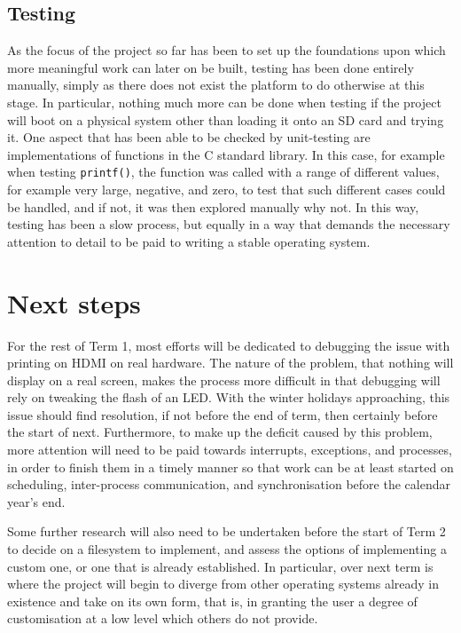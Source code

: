 \documentclass[10pt,a4paper]{article}
\newcommand{\code}[1]{\texttt{#1}}
\begin{document}
\subsection{Testing}
As the focus of the project so far has been to set up the foundations upon which
more meaningful work can later on be built, testing has been done entirely
manually, simply as there does not exist the platform to do otherwise at this
stage. In particular, nothing much more can be done when testing if the project
will boot on a physical system other than loading it onto an SD card and
trying it. One aspect that has been able to be checked by unit-testing are
implementations of functions in the C standard library. In this case, for
example when testing \code{printf()}, the function was called with a range of
different values, for example very large, negative, and zero, to test that such
different cases could be handled, and if not, it was then explored manually why
not. In this way, testing has been a slow process, but equally in a way that
demands the necessary attention to detail to be paid to writing a stable
operating system.

\section{Next steps}
For the rest of Term 1, most efforts will be dedicated to debugging the issue
with printing on HDMI on real hardware. The nature of the problem, that nothing
will display on a real screen, makes the process more difficult in that
debugging will rely on tweaking the flash of an LED. With the winter holidays
approaching, this issue should find resolution, if not before the end of term,
then certainly before the start of next. Furthermore, to make up the deficit
caused by this problem, more attention will need to be paid towards interrupts,
exceptions, and processes, in order to finish them in a timely manner so that
work can be at least started on scheduling, inter-process communication, and
synchronisation before the calendar year's end.

Some further research will also need to be undertaken before the start of Term 2
to decide on a filesystem to implement, and assess the options of implementing a
custom one, or one that is already established. In particular, over next term is
where the project will begin to diverge from other operating systems already in
existence and take on its own form, that is, in granting the user a degree of
customisation at a low level which others do not provide.
\end{document}
